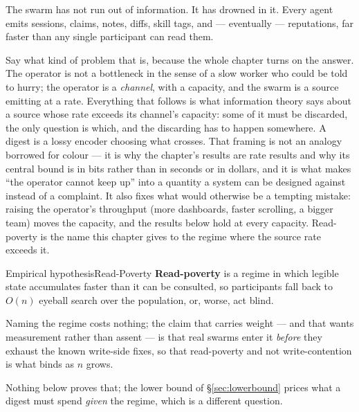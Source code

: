 \documentclass[11pt,a4paper]{article}
\theoremstyle{definition}
\theoremstyle{plain}
\begin{document}
The swarm has not run out of information. It has drowned in it. Every agent emits
sessions, claims, notes, diffs, skill tags, and --- eventually --- reputations, far
faster than any single participant can read them.

Say what kind of problem that is, because the whole chapter turns on the answer.
The operator is not a bottleneck in the sense of a slow worker who could be told
to hurry; the operator is a \emph{channel}, with a capacity, and the swarm is a
source emitting at a rate. Everything that follows is what information theory
says about a source whose rate exceeds its channel's capacity: some of it must
be discarded, the only question is which, and the discarding has to happen
somewhere. A digest is a lossy encoder choosing what crosses. That framing is
not an analogy borrowed for colour --- it is why the chapter's results are rate
results and why its central bound is in bits rather than in seconds or in
dollars, and it is what makes ``the operator cannot keep up'' into a quantity a
system can be designed against instead of a complaint. It also fixes what would
otherwise be a tempting mistake: raising the operator's throughput (more
dashboards, faster scrolling, a bigger team) moves the capacity, and the results
below hold at every capacity. Read-poverty is the name this chapter gives to the
regime where the source rate exceeds it.

\begin{pdclaim}{Empirical hypothesis}{Read-Poverty}
\setlength{\parskip}{4pt plus 1pt}
\label{def:readpoverty}
\textbf{Read-poverty} is a regime in which legible state accumulates faster than it
can be consulted, so participants fall back to $O(n)$ eyeball search over the
population, or, worse, act blind.

Naming the regime costs nothing; the claim that
carries weight --- and that wants measurement rather than assent --- is that real
swarms enter it \emph{before} they exhaust the known write-side fixes, so that
read-poverty and not write-contention is what binds as $n$ grows.

Nothing below
proves that; the lower bound of \S\ref{sec:lowerbound} prices what a digest must
spend \emph{given} the regime, which is a different question.
\end{pdclaim}

\end{document}
